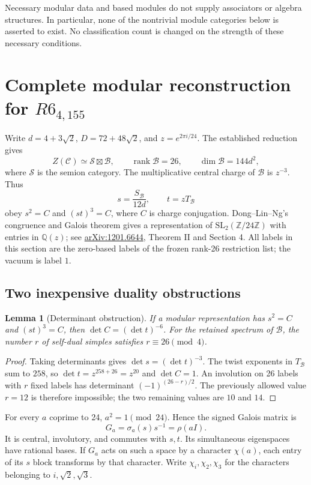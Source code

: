 \documentclass[11pt]{article}
\newtheorem{lemma}[theorem]{Lemma}
\newcommand{\C}{\mathcal C}
\newcommand{\rank}{\operatorname{rank}}
\begin{document}
Necessary modular data and based modules do not supply associators or
algebra structures. In particular, none of the nontrivial module
categories below is asserted to exist. No classification count is
changed on the strength of these necessary conditions.

\section{Complete modular reconstruction for $R6_{4,155}$}

Write $d=4+3\sqrt2$, $D=72+48\sqrt2$, and $z=e^{2\pi i/24}$.
The established reduction gives
\[
 Z(\C)\simeq\mathcal S\boxtimes\mathcal B,
 \qquad \rank\mathcal B=26,\qquad
 \dim\mathcal B=144d^2,
\]
where $\mathcal S$ is the semion category. The multiplicative central
charge of $\mathcal B$ is $z^{-3}$. Thus
\[
 s=\frac{S_{\mathcal B}}{12d},\qquad t=zT_{\mathcal B}
\]
obey $s^2=C$ and $(st)^3=C$, where $C$ is charge conjugation.
Dong--Lin--Ng's congruence and Galois theorem gives a representation of
$\mathrm{SL}_2(\mathbb Z/24\mathbb Z)$ with entries in
$\mathbb Q(z)$; see \href{https://arxiv.org/abs/1201.6644}{arXiv:1201.6644},
Theorem II and Section 4. All labels in this section are the zero-based
labels of the frozen rank-26 restriction list; the vacuum is label $1$.

\subsection{Two inexpensive duality obstructions}

\begin{lemma}[Determinant obstruction]
If a modular representation has $s^2=C$ and $(st)^3=C$, then
$\det C=(\det t)^{-6}$.
For the retained spectrum of $\mathcal B$, the number $r$ of self-dual
simples satisfies $r\equiv26\pmod4$.
\end{lemma}
\begin{proof}
Taking determinants gives $\det s=(\det t)^{-3}$.
The twist exponents in $T_{\mathcal B}$ sum to $258$, so
$\det t=z^{258+26}=z^{20}$ and $\det C=1$.
An involution on 26 labels with $r$ fixed labels has determinant
$(-1)^{(26-r)/2}$. The previously allowed value $r=12$ is therefore
impossible; the two remaining values are $10$ and $14$.
\end{proof}

For every $a$ coprime to 24, $a^2=1\pmod{24}$. Hence the signed Galois
matrix is
\[
 G_a=\sigma_a(s)s^{-1}=\rho(aI).
\]
It is central, involutory, and commutes with $s,t$. Its simultaneous
eigenspaces have rational bases. If $G_a$ acts on such a space by a
character $\chi(a)$, each entry of its $s$ block transforms by that
character. Write $\chi_i,\chi_2,\chi_3$ for the characters belonging
to $i,\sqrt2,\sqrt3$.
\end{document}

